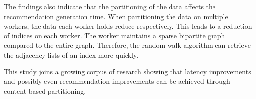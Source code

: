  The findings also indicate that the partitioning of the data affects the recommendation generation time. When partitioning the data on multiple workers, the data each worker holds reduce respectively. This leads to a reduction of indices on each worker. The worker maintains a sparse bipartite graph compared to the entire graph. Therefore, the random-walk algorithm can retrieve the adjacency lists of an index more quickly.


This study joins a growing corpus of research showing that latency improvements and possibly even recommendation improvements can be achieved through content-based partitioning.
